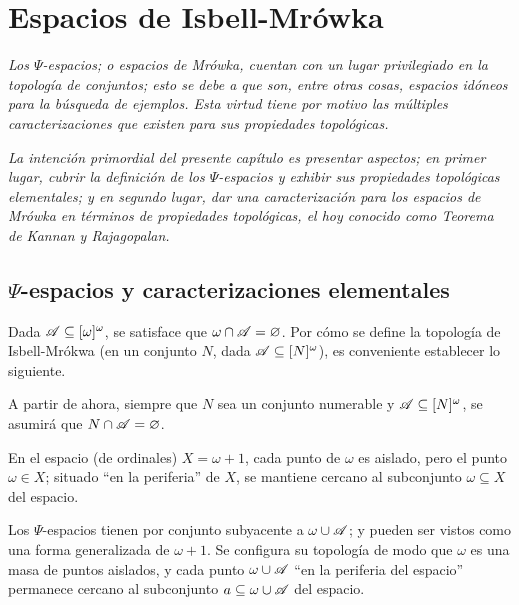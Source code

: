 \chapter{Espacios de Isbell-Mrówka}\label{chap-mrowkas}
\emph{\small Los $\Psi$-espacios; o espacios de Mrówka, cuentan con un lugar privilegiado en la topología de conjuntos; esto se debe a que son, entre otras cosas, espacios idóneos para la búsqueda de ejemplos. Esta virtud tiene por motivo las múltiples caracterizaciones que existen para sus propiedades topológicas.}

\emph{\small La intención primordial del presente capítulo es presentar aspectos; en primer lugar, cubrir la definición de los $\Psi$-espacios y exhibir sus propiedades topológicas elementales; y en segundo lugar, dar una caracterización para los espacios de Mrówka en términos de propiedades topológicas, el hoy conocido como Teorema de Kannan y Rajagopalan.}

\section{\texorpdfstring{$\Psi$-espacios y caracterizaciones elementales}{Psi-espacios y caracterizaciones elementales}}

Dada $\mathscr{A} \subseteq [\omega]^\omega$, se satisface que $\omega \cap \mathscr{A} = \varnothing$. Por cómo se define la topología de Isbell-Mrókwa (en un conjunto $N$, dada $\mathscr{A}\subseteq[N]^\omega$), es conveniente establecer lo siguiente.

\begin{consideracion}\label{cons-ajenosNyA}
	A partir de ahora, siempre que $N$ sea un conjunto numerable y $\mathscr{A} \subseteq [N]^\omega$, se asumirá que $N \cap \mathscr{A} = \varnothing$.
\end{consideracion}

En el espacio (de ordinales) $X=\omega+1$, cada punto de $\omega$ es aislado, pero el punto $\omega \in X$; situado ``en la periferia'' de $X$, se mantiene cercano al subconjunto $\omega \subseteq X$ del espacio.

Los $\Psi$-espacios tienen por conjunto subyacente a $\omega \cup \mathscr{A}$; y pueden ser vistos como una forma generalizada de $\omega+1$. Se configura su topología de modo que $\omega$ es una masa de puntos aislados, y cada punto $\omega \cup \mathscr{A}$ ``en la periferia del espacio'' permanece cercano al subconjunto $a \subseteq \omega \cup \mathscr{A}$ del espacio.

